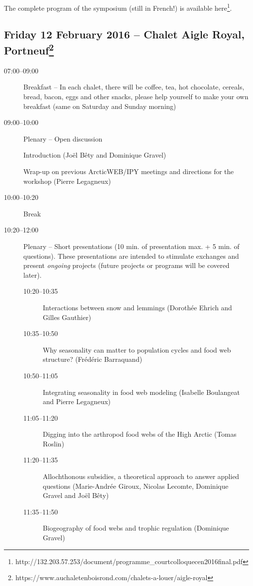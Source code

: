 \documentclass[10pt,letterpaper]{article}
\begin{document}
The complete program of the symposium (still in French!) is available here\footnote{http://132.203.57.253/document/programme\_courtcolloquecen2016final.pdf}.

\vspace{0.35cm}

\subsection*{Friday 12 February 2016 -- Chalet Aigle Royal, Portneuf\footnote{https://www.auchaletenboisrond.com/chalets-a-louer/aigle-royal}}

\vspace{0.35cm}

\begin{description}
    \item[07:00--09:00] Breakfast -- In each chalet, there will be coffee, tea, hot chocolate, cereals, bread, bacon, eggs and other snacks, please help yourself to make your own breakfast (same on Saturday and Sunday morning)
    \item[09:00--10:00] Plenary -- Open discussion

    Introduction (Joël Bêty and Dominique Gravel)

    Wrap-up on previous ArcticWEB/IPY meetings and directions for the workshop (Pierre Legagneux)

    \item[10:00--10:20] Break

    \item[10:20--12:00] Plenary -- Short presentations (10 min. of presentation max. + 5 min. of questions). These presentations are intended to stimulate exchanges and present \textit{ongoing} projects (future projects or programs will be covered later).

    \begin{description}
        \item[10:20--10:35] Interactions between snow and lemmings (Dorothée Ehrich and Gilles Gauthier)
        \item[10:35--10:50] Why seasonality can matter to population cycles and food web structure? (Frédéric Barraquand)
        \item[10:50--11:05] Integrating seasonality in food web modeling (Isabelle Boulangeat and Pierre Legagneux)
        \item[11:05--11:20] Digging into the arthropod food webs of the High Arctic (Tomas Roslin)
        \item[11:20--11:35] Allochthonous subsidies, a theoretical approach to answer applied questions (Marie-Andrée Giroux, Nicolas Lecomte, Dominique Gravel and Joël Bêty)
        \item[11:35--11:50] Biogeography of food webs and trophic regulation (Dominique Gravel)
    \end{description}


\end{description}
\end{document}
